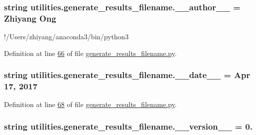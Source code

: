\subsubsection[{\+\_\+\+\_\+author\+\_\+\+\_\+}]{\setlength{\rightskip}{0pt plus 5cm}string utilities.\+generate\+\_\+results\+\_\+filename.\+\_\+\+\_\+author\+\_\+\+\_\+ = \textquotesingle{}Zhiyang Ong\textquotesingle{}}\label{namespaceutilities_1_1generate__results__filename_ad6ef48cbe2a62d40da9c310ff84c9389}


!/\+Users/zhiyang/anaconda3/bin/python3 



Definition at line \hyperlink{generate__results__filename_8py_source_l00066}{66} of file \hyperlink{generate__results__filename_8py_source}{generate\+\_\+results\+\_\+filename.\+py}.

\hypertarget{namespaceutilities_1_1generate__results__filename_a26c03761d2937c6b0a2688c27fedd481}{}
\subsubsection[{\+\_\+\+\_\+date\+\_\+\+\_\+}]{\setlength{\rightskip}{0pt plus 5cm}string utilities.\+generate\+\_\+results\+\_\+filename.\+\_\+\+\_\+date\+\_\+\+\_\+ = \textquotesingle{}Apr 17, 2017\textquotesingle{}}\label{namespaceutilities_1_1generate__results__filename_a26c03761d2937c6b0a2688c27fedd481}


Definition at line \hyperlink{generate__results__filename_8py_source_l00068}{68} of file \hyperlink{generate__results__filename_8py_source}{generate\+\_\+results\+\_\+filename.\+py}.

\hypertarget{namespaceutilities_1_1generate__results__filename_a278d4471bcb9b4e800f698ee4492eac3}{}
\subsubsection[{\+\_\+\+\_\+version\+\_\+\+\_\+}]{\setlength{\rightskip}{0pt plus 5cm}string utilities.\+generate\+\_\+results\+\_\+filename.\+\_\+\+\_\+version\+\_\+\+\_\+ = \textquotesingle{}0.\textquotesingle{}}\label{namespaceutilities_1_1generate__results__filename_a278d4471bcb9b4e800f698ee4492eac3}


